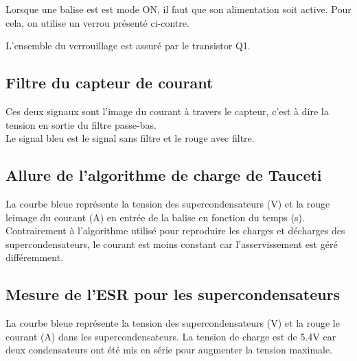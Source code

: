 Lorsque une balise est est mode ON, il faut que son alimentation soit active. Pour cela, on utilise un verrou présenté ci-contre.



L'ensemble du verrouillage est assuré par le transistor Q1.

\subsection{Filtre du capteur de courant}
Ces deux signaux sont l'image du courant à travers le capteur, c'est à dire la tension en sortie du filtre passe-bas.\\
Le signal bleu est le signal sans filtre et le rouge avec filtre.




\subsection{Allure de l'algorithme de charge de Tauceti}

La courbe bleue représente la tension des supercondensateurs (V) et la rouge leimage du courant (A) en entrée de la balise en fonction du temps (s). \\Contrairement à l'algorithme utilisé pour reproduire les charges et décharges des supercondensateurs, le courant est moins constant car l'asservissement est géré différemment.


\subsection{Mesure de l'ESR pour les supercondensateurs}
La courbe bleue représente la tension des supercondensateurs (V) et la rouge le courant (A) dans les supercondensateurs. La tension de charge est de 5.4V car deux condensateurs ont été mis en série pour augmenter la tension maximale.

